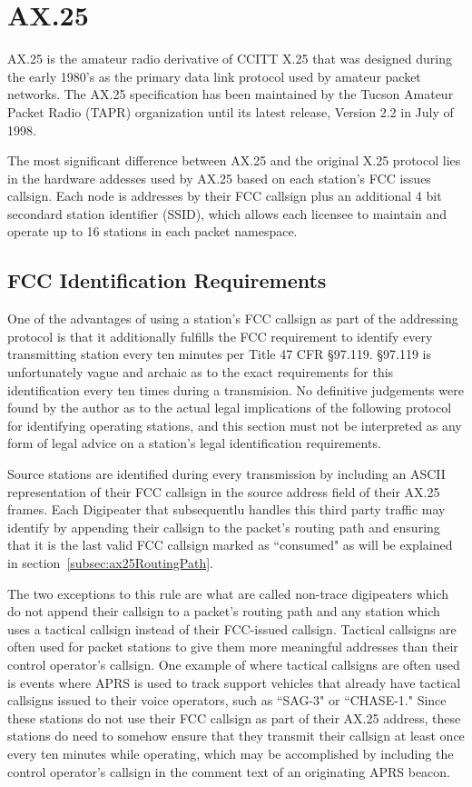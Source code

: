 \chapter{AX.25}

AX.25 is the amateur radio derivative of CCITT X.25 that was designed during the early 1980's 
as the primary data link protocol used by amateur packet networks.
The AX.25 specification has been maintained by the Tucson Amateur Packet Radio (TAPR) 
organization until its latest release, Version 2.2 in July of 1998. 

The most significant difference between AX.25 and the original X.25 protocol lies
in the hardware addesses used by AX.25 based on each station's FCC issues callsign. 
Each node is addresses by their FCC callsign plus an additional 4 bit 
secondard station identifier (SSID), which allows each licensee to maintain and operate 
up to 16 stations in each packet namespace.

\section{FCC Identification Requirements}

One of the advantages of using a station's FCC callsign as part of the addressing protocol
is that it additionally fulfills the FCC requirement to identify every transmitting station
every ten minutes per Title 47 CFR \S97.119. \S97.119 is unfortunately vague and archaic as
to the exact requirements for this identification every ten times during a transmision. No
definitive judgements were found by the author as to 
the actual legal implications of the following protocol
for identifying operating stations, and this section must not be interpreted as any form of
legal advice on a station's legal identification requirements.

Source stations are identified during every transmission by including an ASCII representation
of their FCC callsign in the source address field of their AX.25 frames. 
Each Digipeater that subsequentlu handles this third party traffic may identify by appending 
their callsign to the packet's routing path and ensuring that it is the last valid FCC callsign
marked as ``consumed" as will be explained in section~\ref{subsec:ax25RoutingPath}.

The two exceptions to this rule are what are called non-trace digipeaters which do not
append their callsign to a packet's routing path and any station which uses a tactical callsign
instead of their FCC-issued callsign. Tactical callsigns are often used for packet stations to
give them more meaningful addresses than their control operator's callsign. One example of where
tactical callsigns are often used is events where APRS is used to track support vehicles that 
already have tactical callsigns issued to their voice operators, such as ``SAG-3" or ``CHASE-1."
Since these stations do not use their FCC callsign as part of their AX.25 address,
these stations do need to somehow ensure that they transmit their callsign 
at least once every ten minutes while operating, which
may be accomplished by including the control operator's callsign in the comment text of an 
originating APRS beacon.

